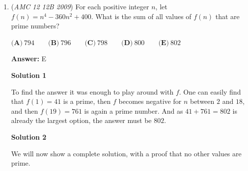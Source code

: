 \begin{enumerate}
 \[[630 - 11.25, 630 + 11.25] = [618.75, 641.25]\]

            \begin{itemize}
        \item Robert's Frame Window: Robert completes a full lap every $80$ seconds. Within the $600\text{--}660$ second interval, he crosses the starting line exactly at $t = 640$ seconds ($8 \times 80 = 640$). Since he takes $\frac{1}{8} \times 80 = 10$ seconds to cover $\frac{1}{8}$ of a lap, he is visible in the frame from $10$ seconds before crossing to $10$ seconds after:
            \end{itemize}
            
 \[[640 - 10, 640 + 10] = [630, 650]\]
To find the time where both runners are simultaneously in the picture, we take the intersection of their individual intervals by selecting the most restrictive bounds:
 \[\text{Intersection} = [618.75, 641.25] \cap [630, 650] = [630, 641.25]\]

 The total duration of this overlapping success window is $641.25 - 630 = 11.25$ seconds. 

 Dividing this successful interval by the total $60$-second photo span yields the target probability:
 \[P = \frac{11.25}{60} = \frac{1125}{6000} = \frac{45}{240} = \boxed{\text{(C) } \frac{3}{16}}\]



	\item (\textit{AMC 12 12B 2009}) For each positive integer $n$, let $f(n) = n^4 - 360n^2 + 400$. What is the sum of all values of $f(n)$ that are prime numbers?


 $\textbf{(A)}\ 794\qquad \textbf{(B)}\ 796\qquad \textbf{(C)}\ 798\qquad \textbf{(D)}\ 800\qquad \textbf{(E)}\ 802$

 \textbf{Answer: }E



\textbf{Solution 1}

To find the answer it was enough to play around with $f$. One can easily find that $f(1)=41$ is a prime, then $f$ becomes negative for $n$ between $2$ and $18$, and then $f(19)=761$ is again a prime number. And as $41 + 761 = 802$ is already the largest option, the answer must be $\boxed{802}$.

 



\textbf{Solution 2}

We will now show a complete solution, with a proof that no other values are prime. 


\end{enumerate}
